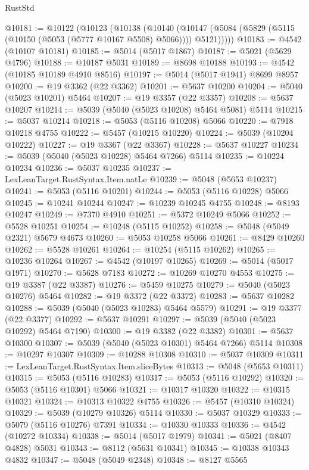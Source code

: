 \begin{lexlean}{RustStd}
\begin{coremodule}
@10181 := @10122
    (@10123
      (@10138
        (@10140
          (@10147 (@5084 (@5829 (@5115 (@10150 (@5053 (@5777 @10167 @5508) @5066)))) @5121)))))
@10183 := @4542 (@10107 @10181)
@10185 := @5014 (@5017 @1867)
@10187 := @5021 (@5629 @4796)
@10188 := @10187 @5031
@10189 := @8698 @10188
@10193 := @4542 (@10185 @10189 @4910 @8516)
@10197 := @5014 (@5017 @1941) @8699 @8957
@10200 := @19 @3362 (@22 @3362)
@10201 := @5637 @10200
@10204 := @5040 (@5023 @10201) @5464
@10207 := @19 @3357 (@22 @3357)
@10208 := @5637 @10207
@10214 := @5039 (@5040 (@5023 @10208) @5464 @5081) @5114
@10215 := @5037 @10214
@10218 := @5053 (@5116 @10208) @5066
@10220 := @7918 @10218 @4755
@10222 := @5457 (@10215 @10220)
@10224 := @5039 (@10204 @10222)
@10227 := @19 @3367 (@22 @3367)
@10228 := @5637 @10227
@10234 := @5039 (@5040 (@5023 @10228) @5464 @7266) @5114
@10235 := @10224 @10234
@10236 := @5037 @10235
@10237 := LexLeanTarget.RustSyntax.Item.natLe
@10239 := @5048 (@5653 @10237)
@10241 := @5053 (@5116 @10201)
@10244 := @5053 (@5116 @10228) @5066
@10245 := @10241 @10244
@10247 := @10239 @10245 @4755
@10248 := @8193 @10247
@10249 := @7370 @4910
@10251 := @5372 @10249 @5066
@10252 := @5528 @10251
@10254 := @10248 (@5115 @10252)
@10258 := @5048 (@5049 @2321) @5679 @4673
@10260 := @5053 @10258 @5066
@10261 := @8429 @10260
@10262 := @5528 @10261
@10264 := @10254 (@5115 @10262)
@10265 := @10236 @10264
@10267 := @4542 (@10197 @10265)
@10269 := @5014 (@5017 @1971)
@10270 := @5628 @7183
@10272 := @10269 @10270 @4553
@10275 := @19 @3387 (@22 @3387)
@10276 := @5459 @10275
@10279 := @5040 (@5023 @10276) @5464
@10282 := @19 @3372 (@22 @3372)
@10283 := @5637 @10282
@10288 := @5039 (@5040 (@5023 @10283) @5464 @5579)
@10291 := @19 @3377 (@22 @3377)
@10292 := @5637 @10291
@10297 := @5039 (@5040 (@5023 @10292) @5464 @7190)
@10300 := @19 @3382 (@22 @3382)
@10301 := @5637 @10300
@10307 := @5039 (@5040 (@5023 @10301) @5464 @7266) @5114
@10308 := @10297 @10307
@10309 := @10288 @10308
@10310 := @5037 @10309
@10311 := LexLeanTarget.RustSyntax.Item.sliceBytes
@10313 := @5048 (@5653 @10311)
@10315 := @5053 (@5116 @10283)
@10317 := @5053 (@5116 @10292)
@10320 := @5053 (@5116 @10301) @5066
@10321 := @10317 @10320
@10322 := @10315 @10321
@10324 := @10313 @10322 @4755
@10326 := @5457 (@10310 @10324)
@10329 := @5039 (@10279 @10326) @5114
@10330 := @5037 @10329
@10333 := @5079 (@5116 @10276) @7391
@10334 := @10330 @10333
@10336 := @4542 (@10272 @10334)
@10338 := @5014 (@5017 @1979)
@10341 := @5021 (@8407 @4828) @5031
@10343 := @8112 (@5631 @10341)
@10345 := @10338 @10343 @4832
@10347 := @5048 (@5049 @2348)
@10348 := @8127 @5565

\end{coremodule}
\end{lexlean}
